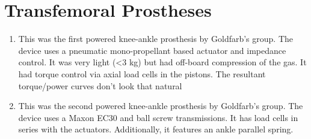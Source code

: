 \section{Transfemoral Prostheses}\label{sec:Transfemoral_Prosthesis_Design}
\begin{enumerate} 
    \item {}


    This was the first powered knee-ankle prosthesis by Goldfarb's group. The
    device uses a pneumatic mono-propellant based actuator and impedance
    control. It was very light (<3 kg) but had off-board compression of the gas.
    It had torque control via axial load cells in the pistons. The resultant
    torque/power curves don't look that natural

    \item {}


    This was the second powered knee-ankle prosthesis by Goldfarb's group. The
    device uses a Maxon EC30 and ball screw transmissions. It has load cells in
    series with the actuators. Additionally, it features an ankle parallel
    spring.
    
\end{enumerate}
